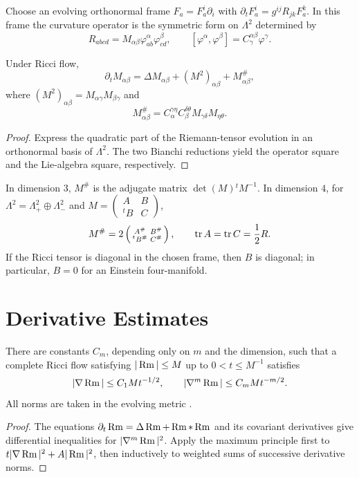 Choose an evolving orthonormal frame $F_a=F_a^i\partial_i$ with
$\partial_tF_a^i=g^{ij}R_{jk}F_a^k$.  In this frame the curvature
operator is the symmetric form on $\Lambda^2$ determined by
\[
R_{abcd}=M_{\alpha\beta}\varphi_{ab}^\alpha\varphi_{cd}^\beta,
\qquad
[\varphi^\alpha,\varphi^\beta]=C^{\alpha\beta}_\gamma\varphi^\gamma.
\]

\begin{proposition}
  \label{prop:cz-evolution-of-the-curvature-operator}
Under Ricci flow,
\[
\partial_tM_{\alpha\beta}=\Delta M_{\alpha\beta}
+(M^2)_{\alpha\beta}+M^\#_{\alpha\beta},
\]
where $(M^2)_{\alpha\beta}=M_{\alpha\gamma}M_{\beta\gamma}$ and
\[
M^\#_{\alpha\beta}=C_\alpha^{\gamma\eta}C_\beta^{\delta\theta}
M_{\gamma\delta}M_{\eta\theta}.
\]
\cite{Ha86}
\end{proposition}
\begin{proof}
\sketch Express the quadratic part of the Riemann-tensor evolution in
an orthonormal basis of $\Lambda^2$.  The two Bianchi reductions yield
the operator square and the Lie-algebra square, respectively.
\end{proof}

In dimension $3$, $M^\#$ is the adjugate matrix
$\det(M){}^tM^{-1}$.  In dimension $4$, for
$\Lambda^2=\Lambda^2_+\oplus\Lambda^2_-$ and
$M=\left(\begin{smallmatrix}A&B\\{}^tB&C\end{smallmatrix}\right)$,
\[
M^\#=2\left(\begin{smallmatrix}A^\#&B^\#\\{}^tB^\#&C^\#\end{smallmatrix}\right),
\qquad \operatorname{tr} A=\operatorname{tr} C=\frac12R.
\]
If the Ricci tensor is diagonal in the chosen frame, then $B$ is
diagonal; in particular, $B=0$ for an Einstein four-manifold.

\section{Derivative Estimates}

\begin{theorem}
  \label{thm:cz-global-curvature-derivative-estimates}
There are constants $C_m$, depending only on $m$ and the dimension,
such that a complete Ricci flow satisfying $|\operatorname{Rm}|\le M$ up to
$0<t\le M^{-1}$ satisfies
\[
|\nabla\operatorname{Rm}|\le C_1M t^{-1/2},\qquad
|\nabla^m\operatorname{Rm}|\le C_mM t^{-m/2}.
\]
All norms are taken in the evolving metric \cite{Sh89}.
\end{theorem}
\begin{proof}
\sketch The equations $\partial_t\operatorname{Rm}=\Delta\operatorname{Rm}+\operatorname{Rm}*\operatorname{Rm}$ and its
covariant derivatives give differential inequalities for
$|\nabla^m\operatorname{Rm}|^2$.  Apply the maximum principle first to
$t|\nabla\operatorname{Rm}|^2+A|\operatorname{Rm}|^2$, then inductively to weighted sums of
successive derivative norms.
\end{proof}

